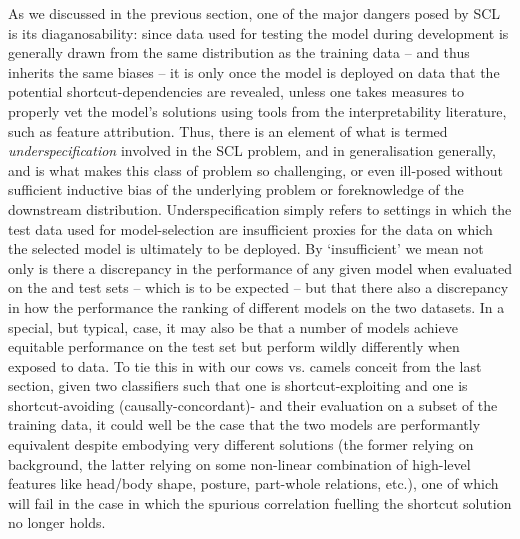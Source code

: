 As we discussed in the previous section, one of the major dangers posed by SCL is its
diaganosability: since data used for testing the model during development is generally drawn from
the same distribution as the training data -- and thus inherits the same biases -- it is only once
the model is deployed on \ood{} data that the potential shortcut-dependencies are revealed, unless
one takes measures to properly vet the model's solutions using tools from the interpretability
literature, such as feature attribution.
%
Thus, there is an element of what is termed \emph{underspecification} involved in the SCL problem,
and in \ood{} generalisation generally, and is what makes this class of problem so challenging, or
even ill-posed without sufficient inductive bias of the underlying problem or foreknowledge of the
downstream distribution.
%
Underspecification simply refers to settings in which the \iid{} test data used for model-selection are
insufficient proxies for the data on which the selected model is ultimately to be deployed.
%
By `insufficient' we mean not only is there a discrepancy in the performance of any given model
when evaluated on the \iid{} and \ood{} test sets -- which is to be expected -- but that there also
a discrepancy in how the performance the ranking of different models on the two datasets.
%
In a special, but typical, case, it may also be that a number of models achieve equitable
performance on the \iid{} test set but perform wildly differently when exposed to \ood{} data.
%
To tie this in with our cows vs. camels conceit from the last section, given two classifiers such
that one is shortcut-exploiting and one is shortcut-avoiding (causally-concordant)- and their
evaluation on a subset of the training data, it could well be the case that the two models are
performantly equivalent despite embodying very different solutions (the former relying on
background, the latter relying on some non-linear combination of high-level features like head/body
shape, posture, part-whole relations, etc.), one of which will fail in the \ood{} case in which the
spurious correlation fuelling the shortcut solution no longer holds.


